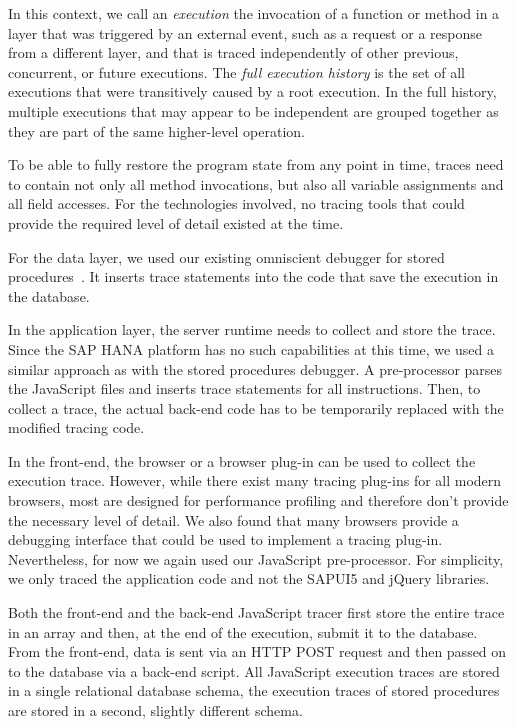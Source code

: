 \documentclass[
      english,
			conference,
      ]{IEEEtran}
\begin{document}
In this context, we call an \emph{execution} the invocation of a function or method in a layer that was triggered by an external event, such as a request or a response from a different layer, and that is traced independently of other previous, concurrent, or future executions.
The \emph{full execution history} is the set of all executions that were transitively caused by a root execution.
In the full history, multiple executions that may appear to be independent are grouped together as they are part of the same higher-level operation.

To be able to fully restore the program state from any point in time, traces need to contain not only all method invocations, but also all variable assignments and all field accesses.
For the technologies involved, no tracing tools that could provide the required level of detail existed at the time.

For the data layer, we used our existing omniscient debugger for stored procedures~\cite{treffer2017bringing}.
It inserts trace statements into the code that save the execution in the database.

In the application layer, the server runtime needs to collect and store the trace.
Since the SAP HANA platform has no such capabilities at this time, we used a similar approach as with the stored procedures debugger.
A pre-processor parses the JavaScript files and inserts trace statements for all instructions.
Then, to collect a trace, the actual back-end code has to be temporarily replaced with the modified tracing code.

In the front-end, the browser or a browser plug-in can be used to collect the execution trace.
However, while there exist many tracing plug-ins for all modern browsers, most are designed for performance profiling and therefore don't provide the necessary level of detail.
We also found that many browsers provide a debugging interface that could be used to implement a tracing plug-in.
Nevertheless, for now we again used our JavaScript pre-processor.
For simplicity, we only traced the application code and not the SAPUI5 and jQuery libraries.

Both the front-end and the back-end JavaScript tracer first store the entire trace in an array and then, at the end of the execution, submit it to the database.
From the front-end, data is sent via an HTTP POST request and then passed on to the database via a back-end script.
All JavaScript execution traces are stored in a single relational database schema, the execution traces of stored procedures are stored in a second, slightly different schema.
\end{document}
